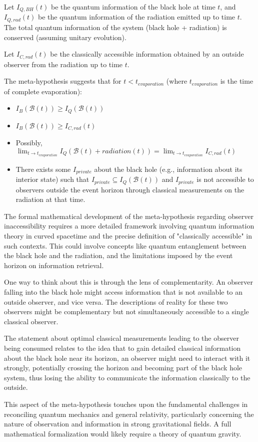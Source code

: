 \begin{enumerate}
		Let $I_{Q, BH}(t)$ be the quantum information of the black hole at time $t$, and $I_{Q, rad}(t)$ be the quantum information of the radiation emitted up to time $t$. The total quantum information of the system (black hole + radiation) is conserved (assuming unitary evolution).
		
		Let $I_{C, rad}(t)$ be the classically accessible information obtained by an outside observer from the radiation up to time $t$.
		
		The meta-hypothesis suggests that for $t < t_{evaporation}$ (where $t_{evaporation}$ is the time of complete evaporation):
		
		\begin{itemize}
			\item $I_B(\mathcal{B}(t)) \ge I_Q(\mathcal{B}(t))$
			\item $I_B(\mathcal{B}(t)) \ge I_{C, rad}(t)$
			\item Possibly, $\lim_{t \to t_{evaporation}} I_Q(\mathcal{B}(t) + radiation(t)) = \lim_{t \to t_{evaporation}} I_{C, rad}(t)$
			\item There exists some $I_{private}$ about the black hole (e.g., information about its interior state) such that $I_{private} \subseteq I_Q(\mathcal{B}(t))$ and $I_{private}$ is not accessible to observers outside the event horizon through classical measurements on the radiation at that time.
		\end{itemize}
		
		The formal mathematical development of the meta-hypothesis regarding observer inaccessibility requires a more detailed framework involving quantum information theory in curved spacetime and the precise definition of "classically accessible" in such contexts. This could involve concepts like quantum entanglement between the black hole and the radiation, and the limitations imposed by the event horizon on information retrieval.
		
		One way to think about this is through the lens of complementarity. An observer falling into the black hole might access information that is not available to an outside observer, and vice versa. The descriptions of reality for these two observers might be complementary but not simultaneously accessible to a single classical observer.
		
		The statement about optimal classical measurements leading to the observer being consumed relates to the idea that to gain detailed classical information about the black hole near its horizon, an observer might need to interact with it strongly, potentially crossing the horizon and becoming part of the black hole system, thus losing the ability to communicate the information classically to the outside.
		
		This aspect of the meta-hypothesis touches upon the fundamental challenges in reconciling quantum mechanics and general relativity, particularly concerning the nature of observation and information in strong gravitational fields. A full mathematical formalization would likely require a theory of quantum gravity.
		
	\end{enumerate}
	
